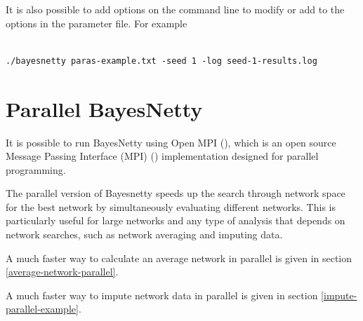 \documentclass[a4paper,12pt]{article}
\begin{document}
It is also possible to add options on the command line to modify or add to the options in the parameter file. For example 
\vspace{0.35cm} \begin{lstlisting}

./bayesnetty paras-example.txt -seed 1 -log seed-1-results.log

\end{lstlisting} \vspace{0.35cm}



\section{Parallel BayesNetty}
\label{parallel}

It is possible to run BayesNetty using Open MPI (\citet{openmpi}), which is an open source Message Passing Interface (MPI) (\citet{mpi}) implementation designed for parallel programming. 

The parallel version of Bayesnetty speeds up the search through network space for the best network by simultaneously evaluating different networks. This is particularly useful for large networks and any type of analysis that depends on network searches, such as network averaging and imputing data. 

A much faster way to calculate an average network in parallel is given in  section \ref{average-network-parallel}. 

A much faster way to impute network data in parallel is given in  section \ref{impute-parallel-example}. 
\end{document}
